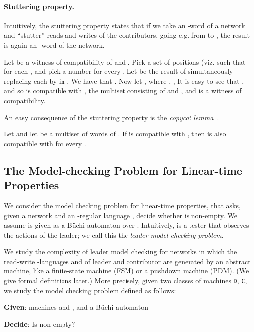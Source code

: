 \documentclass{llncs}
\begin{document}
\paragraph{Stuttering property.}
Intuitively, the stuttering property states that if 
we take an -word of a network  and ``stutter'' reads and writes
of the contributors, going e.g. from 
to , the result
is again an -word of the network.

Let  be a witness of compatibility of 
and . Pick a set  of positions (viz.  such that  for each ,
and pick a number  for every .  Let  be the result of simultaneously 
replacing each  by  in . We have that . 
Now let , where ,  , 
It is easy to see that  , 
and so  is compatible with , the multiset consisting of  and , 
and  is a witness of compatibility.

An easy consequence of the stuttering property is the \emph{copycat lemma}~\cite{egm13}.
\begin{lemma}
\label{lem:extendedmono}
Let  and let  be a multiset of words of
.  If  is compatible with , then  is also compatible with 
for every .
\end{lemma}

\subsection{The Model-checking Problem for Linear-time Properties} 

We consider the model checking problem for linear-time properties, 
that asks, given a network  and an -regular language
, decide whether  is non-empty.
We assume  is given as a B\"uchi automaton  over .
Intuitively,  is a tester that observes the actions of the leader;
we call this the \emph{leader model checking problem}.


We study the complexity of leader model checking for networks in which the 
read-write -languages  and  of leader and contributor are generated by 
an abstract machine, like a finite-state machine (FSM) or a pushdown machine (PDM). 
(We give formal  definitions later.) 
More precisely, given two classes of machines \texttt{D}, \texttt{C}, 
we study the model checking problem  defined as follows: 
\begin{compactdesc}
\item[{\bf Given}:] machines  and , 
and a B\"uchi automaton  
\item[{\bf Decide}:] Is  non-empty? 
\end{compactdesc}
\end{document}
